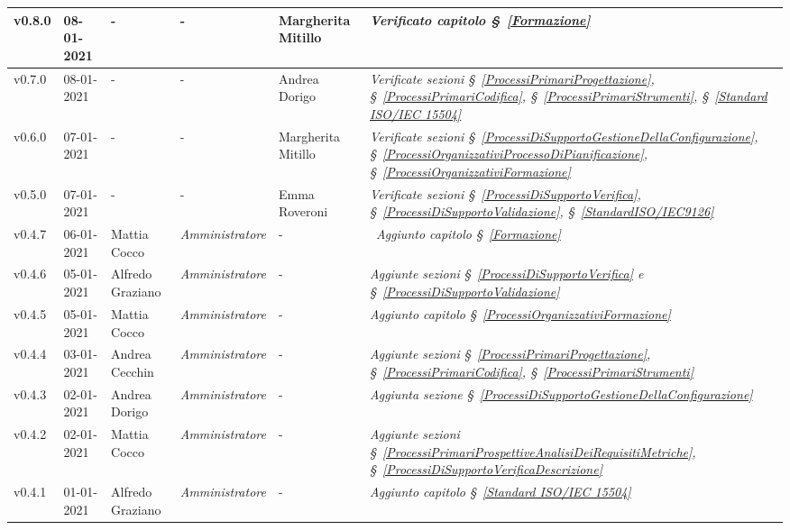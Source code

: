 {\begin{center}
\begin{longtable}[c]{|p{2cm-1\tabcolsep}|p{2cm}|p{3cm-2\tabcolsep}|p{3cm-1.5\tabcolsep}|p{}|p{4cm-2\tabcolsep}|}
		\hline
		\centering v0.8.0 & 08-01-2021 & \centering - & \centering - & Margherita Mitillo & \textit{Verificato capitolo \S~\ref{Formazione}} \\
		\hline
		\centering v0.7.0 & 08-01-2021 & \centering - & \centering - & Andrea Dorigo & \textit{Verificate sezioni \S~\ref{ProcessiPrimariProgettazione}, \S~\ref{ProcessiPrimariCodifica}, \S~\ref{ProcessiPrimariStrumenti}, \S~\ref{Standard ISO/IEC 15504} } \\
		\hline
		\centering v0.6.0 & 07-01-2021 & \centering - & \centering - & Margherita Mitillo & \textit{Verificate sezioni \S~\ref{ProcessiDiSupportoGestioneDellaConfigurazione}, \S~\ref{ProcessiOrganizzativiProcessoDiPianificazione}, \S~\ref{ProcessiOrganizzativiFormazione}} \\
		\hline
		\centering v0.5.0 & 07-01-2021 & \centering - & \centering - & Emma Roveroni & \textit{Verificate sezioni \S~\ref{ProcessiDiSupportoVerifica}, \S~\ref{ProcessiDiSupportoValidazione}, \S~\ref{StandardISO/IEC9126}}  \\
		\hline
		\centering v0.4.7 & 06-01-2021 & Mattia Cocco & \centering \textit{Amministratore} & \centering - & \	\textit{Aggiunto capitolo \S~\ref{Formazione}} \\
		\hline
		\centering v0.4.6 & 05-01-2021 & Alfredo Graziano & \centering \textit{Amministratore} & \centering - & \textit{Aggiunte sezioni \S~\ref{ProcessiDiSupportoVerifica} e \S~\ref{ProcessiDiSupportoValidazione} } \\
		\hline
		\centering v0.4.5 & 05-01-2021 & Mattia Cocco & \centering \textit{Amministratore} & \centering - & \textit{Aggiunto capitolo \S~\ref{ProcessiOrganizzativiFormazione}} \\
		\hline
		\centering v0.4.4 & 03-01-2021 & Andrea Cecchin & \centering \textit{Amministratore} & \centering - & \textit{Aggiunte sezioni \S~\ref{ProcessiPrimariProgettazione}, \S~\ref{ProcessiPrimariCodifica}, \S~\ref{ProcessiPrimariStrumenti}} \\
		\hline
		\centering v0.4.3 & 02-01-2021 & Andrea Dorigo & \centering \textit{Amministratore} & \centering - & \textit{Aggiunta sezione \S~\ref{ProcessiDiSupportoGestioneDellaConfigurazione}} \\
		\hline
		\centering v0.4.2 & 02-01-2021 & Mattia Cocco & \centering \textit{Amministratore} & \centering - & \textit{Aggiunte sezioni \S~\ref{ProcessiPrimariProspettiveAnalisiDeiRequisitiMetriche}, \S~\ref{ProcessiDiSupportoVerificaDescrizione}} \\
		\hline
		\centering v0.4.1 & 01-01-2021 & Alfredo Graziano & \centering \textit{Amministratore} & \centering - & \textit{Aggiunto capitolo \S~\ref{Standard ISO/IEC 15504}} \\

\end{longtable}
\end{center}}
